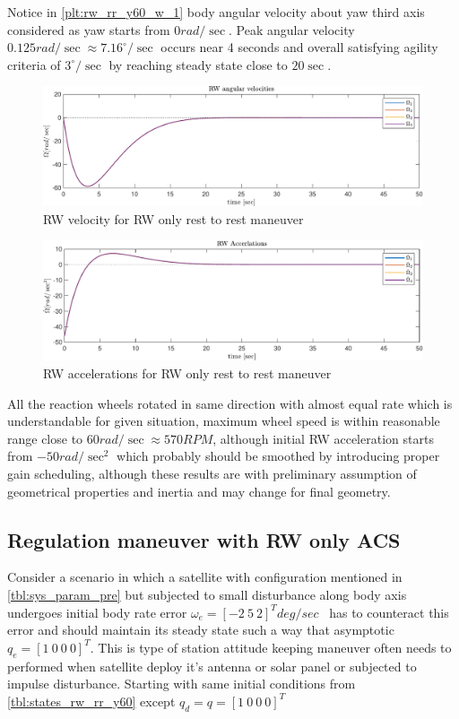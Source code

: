 \noindent Notice in \autoref{plt:rw_rr_y60_w_1} body angular velocity about yaw third axis considered as yaw starts from $0 rad/\sec$. Peak angular velocity $0.125 rad/\sec \approx 7.16^\circ/\sec$ occurs near 4 seconds and overall satisfying agility criteria of $3^\circ/\sec$ by reaching steady state close to $20 \sec$.

\begin{figure}[H]
    \centering
    \includegraphics[width=0.9\columnwidth]{figures/plots/RW/rw_rr_y60_Om.pdf}
    \caption{RW velocity for RW only rest to rest maneuver}
    \label{plt:rw_rr_y60_Om_1}
\end{figure}

\begin{figure}[H]
    \centering
    \includegraphics[width=0.8\columnwidth]{figures/plots/RW/rw_rr_y60_Om_dot.pdf}
    \caption{RW accelerations for RW only rest to rest maneuver}
    \label{plt:rw_rr_y60_Om_dot_1}
\end{figure}

\noindent All the reaction wheels rotated in same direction with almost equal rate which is understandable for given situation, maximum wheel speed is within reasonable range close to $60 rad/\sec \approx 570 RPM$, although initial RW acceleration starts from $-50 rad/\sec^2$ which probably should be smoothed by introducing proper gain scheduling, although these results are with preliminary assumption of geometrical properties and inertia and may change for final geometry.


\subsection{Regulation maneuver with RW only ACS}
Consider a scenario in which a satellite with configuration mentioned in \autoref{tbl:sys_param_pre} but subjected to small disturbance along body axis undergoes initial body rate error $\displaystyle \omega _{e} =[ -2\ 5\ 2]^{T} deg/sec$ \ has to counteract this error and should maintain its steady state such a way that asymptotic $\displaystyle q_{e} =[ 1\ 0\ 0\ 0]^{T}$. This is type of station attitude keeping maneuver often needs to performed when satellite deploy it's antenna or solar panel or subjected to impulse disturbance. Starting with same initial conditions from \autoref{tbl:states_rw_rr_y60} except $\displaystyle q_{d} =q=[ 1\ 0\ 0\ 0]^{T}$

